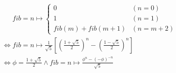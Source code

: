 
\begin{align*}
  &\phantom{\iff} \mathit{fib} = n \mapsto \left\{\begin{array}{ll}
    0 &(n = 0) \\
    1 &(n = 1) \\
    \mathit{fib}(m) + \mathit{fib}(m + 1) &(n = m + 2)
  \end{array}\right. \\
  &\iff \mathit{fib} = n \mapsto \frac{1}{\sqrt{5}}\left[\left(\frac{1 + \sqrt{5}}{2}\right)^n - \left(\frac{1 - \sqrt{5}}{2}\right)^n\right] \\
  &\iff \phi = \frac{1 + \sqrt{5}}{2} \land \mathit{fib} = n \mapsto \frac{\phi^n - (- \phi)^{-n}}{\sqrt{5}}
\end{align*}

